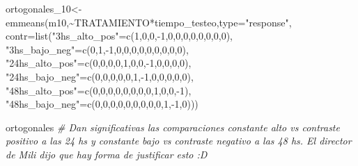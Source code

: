 \documentclass[
]{article}
\newenvironment{Shaded}{\begin{snugshade}}{\end{snugshade}}
\newcommand{\AttributeTok}[1]{\textcolor[rgb]{0.77,0.63,0.00}{#1}}
\newcommand{\CommentTok}[1]{\textcolor[rgb]{0.56,0.35,0.01}{\textit{#1}}}
\newcommand{\DecValTok}[1]{\textcolor[rgb]{0.00,0.00,0.81}{#1}}
\newcommand{\FunctionTok}[1]{\textcolor[rgb]{0.00,0.00,0.00}{#1}}
\newcommand{\NormalTok}[1]{#1}
\newcommand{\OtherTok}[1]{\textcolor[rgb]{0.56,0.35,0.01}{#1}}
\newcommand{\SpecialCharTok}[1]{\textcolor[rgb]{0.00,0.00,0.00}{#1}}
\newcommand{\StringTok}[1]{\textcolor[rgb]{0.31,0.60,0.02}{#1}}
\begin{document}
\begin{Shaded}
\begin{Highlighting}[]
\NormalTok{ortogonales\_10}\OtherTok{\textless{}{-}}\FunctionTok{emmeans}\NormalTok{(m10,}\SpecialCharTok{\textasciitilde{}}\NormalTok{TRATAMIENTO}\SpecialCharTok{*}\NormalTok{tiempo\_testeo,}\AttributeTok{type=}\StringTok{"response"}\NormalTok{,}
                \AttributeTok{contr=}\FunctionTok{list}\NormalTok{(}\StringTok{"3hs\_alto\_pos"}\OtherTok{=}\FunctionTok{c}\NormalTok{(}\DecValTok{1}\NormalTok{,}\DecValTok{0}\NormalTok{,}\DecValTok{0}\NormalTok{,}\SpecialCharTok{{-}}\DecValTok{1}\NormalTok{,}\DecValTok{0}\NormalTok{,}\DecValTok{0}\NormalTok{,}\DecValTok{0}\NormalTok{,}\DecValTok{0}\NormalTok{,}\DecValTok{0}\NormalTok{,}\DecValTok{0}\NormalTok{,}\DecValTok{0}\NormalTok{,}\DecValTok{0}\NormalTok{), }
                     \StringTok{"3hs\_bajo\_neg"}\OtherTok{=}\FunctionTok{c}\NormalTok{(}\DecValTok{0}\NormalTok{,}\DecValTok{1}\NormalTok{,}\SpecialCharTok{{-}}\DecValTok{1}\NormalTok{,}\DecValTok{0}\NormalTok{,}\DecValTok{0}\NormalTok{,}\DecValTok{0}\NormalTok{,}\DecValTok{0}\NormalTok{,}\DecValTok{0}\NormalTok{,}\DecValTok{0}\NormalTok{,}\DecValTok{0}\NormalTok{,}\DecValTok{0}\NormalTok{,}\DecValTok{0}\NormalTok{), }
                     \StringTok{"24hs\_alto\_pos"}\OtherTok{=}\FunctionTok{c}\NormalTok{(}\DecValTok{0}\NormalTok{,}\DecValTok{0}\NormalTok{,}\DecValTok{0}\NormalTok{,}\DecValTok{0}\NormalTok{,}\DecValTok{1}\NormalTok{,}\DecValTok{0}\NormalTok{,}\DecValTok{0}\NormalTok{,}\SpecialCharTok{{-}}\DecValTok{1}\NormalTok{,}\DecValTok{0}\NormalTok{,}\DecValTok{0}\NormalTok{,}\DecValTok{0}\NormalTok{,}\DecValTok{0}\NormalTok{), }
                     \StringTok{"24hs\_bajo\_neg"}\OtherTok{=}\FunctionTok{c}\NormalTok{(}\DecValTok{0}\NormalTok{,}\DecValTok{0}\NormalTok{,}\DecValTok{0}\NormalTok{,}\DecValTok{0}\NormalTok{,}\DecValTok{0}\NormalTok{,}\DecValTok{1}\NormalTok{,}\SpecialCharTok{{-}}\DecValTok{1}\NormalTok{,}\DecValTok{0}\NormalTok{,}\DecValTok{0}\NormalTok{,}\DecValTok{0}\NormalTok{,}\DecValTok{0}\NormalTok{,}\DecValTok{0}\NormalTok{), }
                     \StringTok{"48hs\_alto\_pos"}\OtherTok{=}\FunctionTok{c}\NormalTok{(}\DecValTok{0}\NormalTok{,}\DecValTok{0}\NormalTok{,}\DecValTok{0}\NormalTok{,}\DecValTok{0}\NormalTok{,}\DecValTok{0}\NormalTok{,}\DecValTok{0}\NormalTok{,}\DecValTok{0}\NormalTok{,}\DecValTok{0}\NormalTok{,}\DecValTok{1}\NormalTok{,}\DecValTok{0}\NormalTok{,}\DecValTok{0}\NormalTok{,}\SpecialCharTok{{-}}\DecValTok{1}\NormalTok{), }
                     \StringTok{"48hs\_bajo\_neg"}\OtherTok{=}\FunctionTok{c}\NormalTok{(}\DecValTok{0}\NormalTok{,}\DecValTok{0}\NormalTok{,}\DecValTok{0}\NormalTok{,}\DecValTok{0}\NormalTok{,}\DecValTok{0}\NormalTok{,}\DecValTok{0}\NormalTok{,}\DecValTok{0}\NormalTok{,}\DecValTok{0}\NormalTok{,}\DecValTok{0}\NormalTok{,}\DecValTok{1}\NormalTok{,}\SpecialCharTok{{-}}\DecValTok{1}\NormalTok{,}\DecValTok{0}\NormalTok{)))}

\NormalTok{ortogonales }\CommentTok{\# Dan significativas las comparaciones constante alto vs contraste positivo a las 24 hs y constante bajo vs contraste negativo a las 48 hs. El director de Mili dijo que hay forma de justificar esto :D}
\end{Highlighting}
\end{Shaded}
\end{document}
